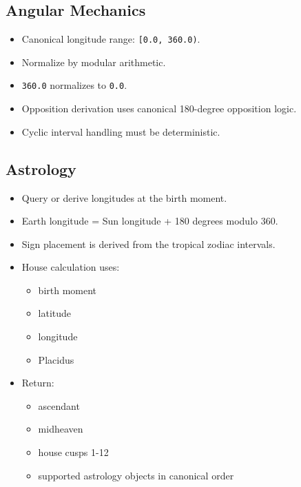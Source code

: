 \documentclass[11pt]{article}
\begin{document}
\subsection{Angular Mechanics}
\label{sec:org879c29f}
\begin{itemize}
\item Canonical longitude range: \texttt{[0.0, 360.0)}.
\item Normalize by modular arithmetic.
\item \texttt{360.0} normalizes to \texttt{0.0}.
\item Opposition derivation uses canonical 180-degree opposition logic.
\item Cyclic interval handling must be deterministic.
\end{itemize}
\subsection{Astrology}
\label{sec:org1ca15cc}
\begin{itemize}
\item Query or derive longitudes at the birth moment.
\item Earth longitude = Sun longitude + 180 degrees modulo 360.
\item Sign placement is derived from the tropical zodiac intervals.
\item House calculation uses:
\begin{itemize}
\item birth moment
\item latitude
\item longitude
\item Placidus
\end{itemize}
\item Return:
\begin{itemize}
\item ascendant
\item midheaven
\item house cusps 1-12
\item supported astrology objects in canonical order
\end{itemize}
\end{itemize}
\end{document}
